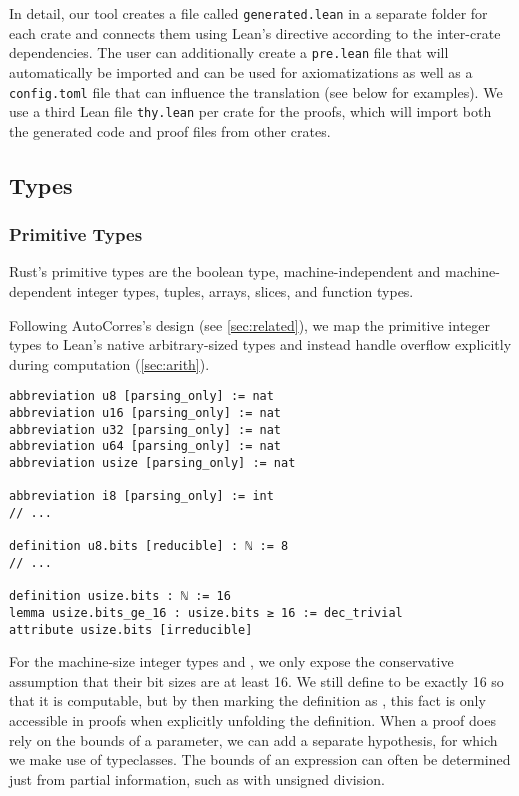 In detail, our tool creates a file called \verb!generated.lean! in a separate
folder for each crate and connects them using Lean's  directive
according to the inter-crate dependencies. The user can additionally create a
\verb!pre.lean! file that will automatically be imported and can be used for
axiomatizations as well as a \verb!config.toml! file that can influence the
translation (see below for examples). We use a third Lean file \verb!thy.lean! per crate
for the proofs, which will import both the generated code and proof files from
other crates.

\subsection{Types}

\subsubsection{Primitive Types}
\label{sec:prim}

Rust's primitive types are the boolean type, machine-independent and machine-dependent integer
types, tuples, arrays, slices, and function types.

Following AutoCorres's design (see \autoref{sec:related}), we map the primitive integer types to
Lean's native arbitrary-sized types and instead handle overflow explicitly
during computation (\autoref{sec:arith}).

\begin{verbatim}
abbreviation u8 [parsing_only] := nat
abbreviation u16 [parsing_only] := nat
abbreviation u32 [parsing_only] := nat
abbreviation u64 [parsing_only] := nat
abbreviation usize [parsing_only] := nat

abbreviation i8 [parsing_only] := int
// ...

definition u8.bits [reducible] : ℕ := 8
// ...

definition usize.bits : ℕ := 16
lemma usize.bits_ge_16 : usize.bits ≥ 16 := dec_trivial
attribute usize.bits [irreducible]
\end{verbatim}

For the machine-size integer types  and , we only expose
the conservative assumption that their bit sizes are at least 16. We still define
 to be exactly 16 so that it is computable, but by then marking
the definition as \rust{[irreducible]}, this fact is only accessible in proofs
when explicitly unfolding the definition.
When a proof does rely on the bounds of a parameter, we can add a separate
hypothesis, for which we make use of typeclasses. The bounds of an expression
can often be determined just from partial information, such as with unsigned division.


